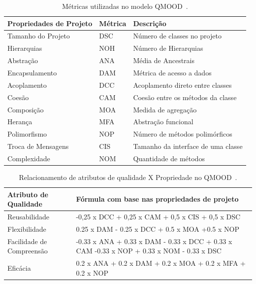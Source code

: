 \begin{table}[!h]
\caption{Métricas utilizadas no modelo QMOOD~\cite{Bansiya_QMOOD}.}
\label{tab:QMOOD_quality_metrics}
\begin{center}
\begin{tabular}{ | m{4.2cm} | m{1.4cm}| m{6cm} | } 
\hline
Propriedades de Projeto & Métrica & Descrição \\ 
\hline
Tamanho do Projeto & DSC & Número de classes no projeto \\ 
\hline
Hierarquias & NOH & Número de Hierarquias \\ 
\hline
Abstração & ANA & Média de Ancestrais \\ 
\hline
Encapsulamento & DAM & Métrica de acesso a dados \\ 
\hline
Acoplamento & DCC & Acoplamento direto entre classes \\ 
\hline
Coesão & CAM & Coesão entre os métodos da classe \\ 
\hline
Composição & MOA & Medida de agregação \\ 
\hline
Herança & MFA & Abstração funcional \\ 
\hline
Polimorfismo & NOP & Número de métodos polimórficos \\ 
\hline
Troca de Mensagens & CIS & Tamanho da interface de uma classe \\ 
\hline
Complexidade & NOM & Quantidade de métodos \\ 
\hline
\end{tabular}
\end{center}
\end{table}

\begin{table}[!h]
\caption{Relacionamento de atributos de qualidade X Propriedade no QMOOD~\cite{Bansiya_QMOOD}.}
\label{tab:QMOOD_quality_metrics2}
\begin{center}
\begin{tabular}{ | m{4cm} | m{10cm} |} 
\hline
Atributo de Qualidade & Fórmula com base nas propriedades de projeto  \\ 
\hline
Reusabilidade & -0,25 x DCC + 0,25 x CAM + 0,5 x CIS + 0,5 x DSC  \\ 
\hline
Flexibilidade & 0.25 x DAM - 0.25 x DCC + 0.5 x MOA +0.5 x NOP \\
\hline
Facilidade de Compreensão & -0.33 x ANA + 0.33 x DAM - 0.33 x DCC + 0.33 x CAM -0.33 x NOP + 0.33 x NOM - 0.33 x DSC \\ 
\hline
Eficácia & 0.2 x ANA + 0.2 x DAM + 0.2 x MOA + 0.2 x MFA + 0.2 x NOP \\ 
\hline
\end{tabular}
\end{center}
\end{table}

